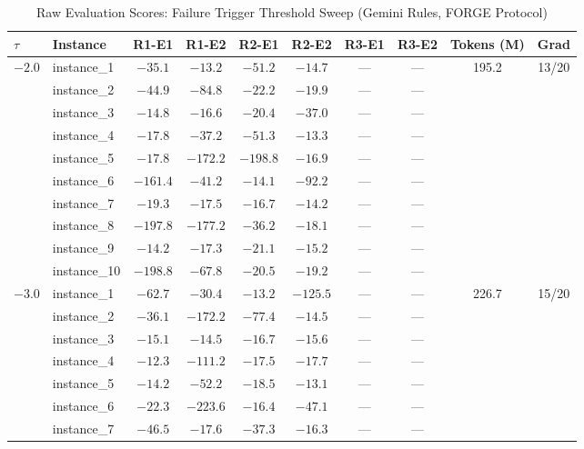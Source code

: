 \documentclass[sigconf]{acmart}
\begin{document}
\begin{table}[htbp]
\centering
\scriptsize
\caption{Raw Evaluation Scores: Failure Trigger Threshold Sweep (Gemini Rules, FORGE Protocol)}
\label{tab:tau-sweep-raw}
\begin{tabular}{llcccccccc}
\toprule
\textbf{$\tau$} & \textbf{Instance} & \textbf{R1-E1} & \textbf{R1-E2} & \textbf{R2-E1} & \textbf{R2-E2} & \textbf{R3-E1} & \textbf{R3-E2} & \textbf{Tokens (M)} & \textbf{Grad} \\
\midrule
$-2.0$ & instance\_1 & $-35.1$ & $-13.2$ & $-51.2$ & $-14.7$ & — & — & \multirow{10}{*}{195.2} & \multirow{10}{*}{13/20} \\
       & instance\_2 & $-44.9$ & $-84.8$ & $-22.2$ & $-19.9$ & — & — & & \\
       & instance\_3 & $-14.8$ & $-16.6$ & $-20.4$ & $-37.0$ & — & — & & \\
       & instance\_4 & $-17.8$ & $-37.2$ & $-51.3$ & $-13.3$ & — & — & & \\
       & instance\_5 & $-17.8$ & $-172.2$ & $-198.8$ & $-16.9$ & — & — & & \\
       & instance\_6 & $-161.4$ & $-41.2$ & $-14.1$ & $-92.2$ & — & — & & \\
       & instance\_7 & $-19.3$ & $-17.5$ & $-16.7$ & $-14.2$ & — & — & & \\
       & instance\_8 & $-197.8$ & $-177.2$ & $-36.2$ & $-18.1$ & — & — & & \\
       & instance\_9 & $-14.2$ & $-17.3$ & $-21.1$ & $-15.2$ & — & — & & \\
       & instance\_10 & $-198.8$ & $-67.8$ & $-20.5$ & $-19.2$ & — & — & & \\
\addlinespace
$-3.0$ & instance\_1 & $-62.7$ & $-30.4$ & $-13.2$ & $-125.5$ & — & — & \multirow{10}{*}{226.7} & \multirow{10}{*}{15/20} \\
       & instance\_2 & $-36.1$ & $-172.2$ & $-77.4$ & $-14.5$ & — & — & & \\
       & instance\_3 & $-15.1$ & $-14.5$ & $-16.7$ & $-15.6$ & — & — & & \\
       & instance\_4 & $-12.3$ & $-111.2$ & $-17.5$ & $-17.7$ & — & — & & \\
       & instance\_5 & $-14.2$ & $-52.2$ & $-18.5$ & $-13.1$ & — & — & & \\
       & instance\_6 & $-22.3$ & $-223.6$ & $-16.4$ & $-47.1$ & — & — & & \\
       & instance\_7 & $-46.5$ & $-17.6$ & $-37.3$ & $-16.3$ & — & — & & \\

\end{tabular}
\end{table}
\end{document}
